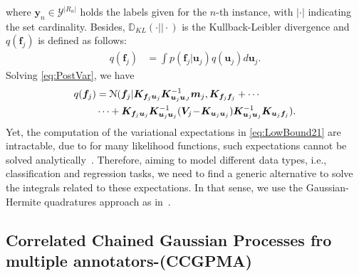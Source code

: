 \documentclass[journal]{IEEEtran}
\providecommand{\ve}[1]{{\bm{#1}}}%
\providecommand{\mat}[1]{{\bm{#1}}} %
\providecommand{\ve}[1]{{\mathbf{#1}}}
\providecommand{\mat}[1]{{\mathbf{#1}}}
\newcommand{\gauss}{\mathcal{N}} %
\begin{document}
where $\ve{y}_n\in \mathcal{Y}^{|R_n|}$ holds the labels given for the $n$-th instance, with $|\cdot|$ indicating the set cardinality. Besides, $\mathbb{D}_{KL}(\cdot||\cdot)$ is the Kullback-Leibler divergence and $q(\ve{f}_j)$ is defined as follows:
\begin{align}
q(\ve{f}_j) &= \int p(\ve{f}_j|\ve{u}_j)q(\ve{u}_j)d\ve{u}_j.
\label{eq:PostVar}
\end{align}
Solving \cref{eq:PostVar}, we have
\begin{align}
\notag q(\ve{f}_j) &= \gauss(\ve{f}_j|\mat{K}_{\ve{f}_j\ve{u}_j}\mat{K}_{\ve{u}_j\ve{u}_J}^{-1}\ve{m}_j, \mat{K}_{\ve{f}_j\ve{f}_j} + \cdots \\
&\cdots + \mat{K}_{\ve{f}_j\ve{u}_j}\mat{K}_{\ve{u}_j\ve{u}_j}^{-1}(\mat{V}_j\!-\!\mat{K}_{\ve{u}_j\ve{u}_j})\mat{K}_{\ve{u}_j\ve{u}_j}^{-1}\mat{K}_{\ve{u}_j\ve{f}_j}).
\end{align}
Yet, the computation of the variational expectations in \cref{eq:LowBound21} are intractable, due to for many likelihood functions, such expectations cannot be solved analytically~\cite{saul2016chained,moreno2018heterogeneous}. Therefore, aiming to model different data types, i.e., classification and regression tasks, we need to find a generic alternative to solve the integrals related to these expectations. In that sense, we use the Gaussian-Hermite quadratures approach as in~\cite{hensman2015scalable,saul2016chained}. 

\subsection{Correlated Chained Gaussian Processes fro multiple  annotators-(CCGPMA)} 
\end{document}
